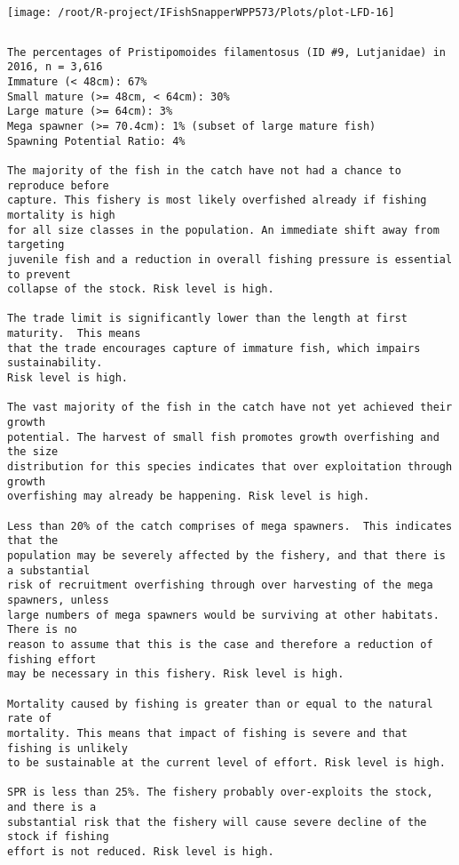 \documentclass{report}\usepackage[]{graphicx}\usepackage[]{color}
\makeatletter
\def\maxwidth{ %
  \ifdim\Gin@nat@width>\linewidth
    \linewidth
  \else
    \Gin@nat@width
  \fi
}
\newenvironment{kframe}{%
 \def\at@end@of@kframe{}%
 \ifinner\ifhmode%
  \def\at@end@of@kframe{\end{minipage}}%
  \begin{minipage}{\columnwidth}%
 \fi\fi%
 \def\FrameCommand##1{\hskip\@totalleftmargin \hskip-\fboxsep
 \colorbox{shadecolor}{##1}\hskip-\fboxsep
     \hskip-\linewidth \hskip-\@totalleftmargin \hskip\columnwidth}%
 \MakeFramed {\advance\hsize-\width
   \@totalleftmargin\z@ \linewidth\hsize
   \@setminipage}}%
 {\par\unskip\endMakeFramed%
 \at@end@of@kframe}
\newenvironment{knitrout}{}{} %
\makeatother
\begin{document}
\begin{knitrout}
\texttt{[image: /root/R-project/IFishSnapperWPP573/Plots/plot-LFD-16]} 
\begin{kframe}\begin{verbatim}
\end{verbatim}
\end{kframe}
\clearpage
\newpage
\begin{kframe}\begin{verbatim}The percentages of Pristipomoides filamentosus (ID #9, Lutjanidae) in 2016, n = 3,616
Immature (< 48cm): 67%
Small mature (>= 48cm, < 64cm): 30%
Large mature (>= 64cm): 3%
Mega spawner (>= 70.4cm): 1% (subset of large mature fish)
Spawning Potential Ratio: 4%
 
The majority of the fish in the catch have not had a chance to reproduce before
capture. This fishery is most likely overfished already if fishing mortality is high
for all size classes in the population. An immediate shift away from targeting
juvenile fish and a reduction in overall fishing pressure is essential to prevent
collapse of the stock. Risk level is high.

The trade limit is significantly lower than the length at first maturity.  This means
that the trade encourages capture of immature fish, which impairs sustainability.
Risk level is high.

The vast majority of the fish in the catch have not yet achieved their growth
potential. The harvest of small fish promotes growth overfishing and the size
distribution for this species indicates that over exploitation through growth
overfishing may already be happening. Risk level is high.

Less than 20% of the catch comprises of mega spawners.  This indicates that the
population may be severely affected by the fishery, and that there is a substantial
risk of recruitment overfishing through over harvesting of the mega spawners, unless
large numbers of mega spawners would be surviving at other habitats. There is no
reason to assume that this is the case and therefore a reduction of fishing effort
may be necessary in this fishery. Risk level is high.
 
Mortality caused by fishing is greater than or equal to the natural rate of
mortality. This means that impact of fishing is severe and that fishing is unlikely
to be sustainable at the current level of effort. Risk level is high.
 
SPR is less than 25%. The fishery probably over-exploits the stock, and there is a
substantial risk that the fishery will cause severe decline of the stock if fishing
effort is not reduced. Risk level is high.
 

\end{verbatim}
\end{kframe}
\end{knitrout}
\end{document}
